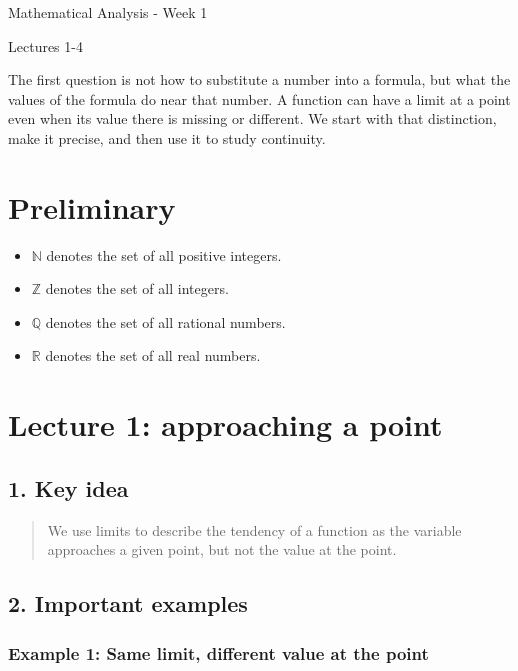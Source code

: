 \documentclass[11pt,a4paper]{article}
\begin{document}
\begin{center}
{\LARGE Mathematical Analysis - Week 1\par}
\vspace{5pt}
{\large Lectures 1-4\par}
\end{center}
{\small\tableofcontents}
\vspace{7pt}
The first question is not how to substitute a number into a formula, but
what the values of the formula do near that number. A function can have
a limit at a point even when its value there is missing or different. We
start with that distinction, make it precise, and then use it to study
continuity.

\section{Preliminary}\label{preliminary}

\begin{itemize}
\item
  \(\mathbb{N}\) denotes the set of all positive integers.
\item
  \(\mathbb{Z}\) denotes the set of all integers.
\item
  \(\mathbb{Q}\) denotes the set of all rational numbers.
\item
  \(\mathbb{R}\) denotes the set of all real numbers.
\end{itemize}

\section{Lecture 1: approaching a
point}\label{lecture-1-approaching-a-point}

\subsection{1. Key idea}\label{key-idea}

\begin{quote}
We use limits to describe the tendency of a function as the variable
approaches a given point, but not the value at the point.
\end{quote}

\subsection{2. Important examples}\label{important-examples}

\subsubsection{Example 1: Same limit, different value at the
point}\label{example-1-same-limit-different-value-at-the-point}
\end{document}
